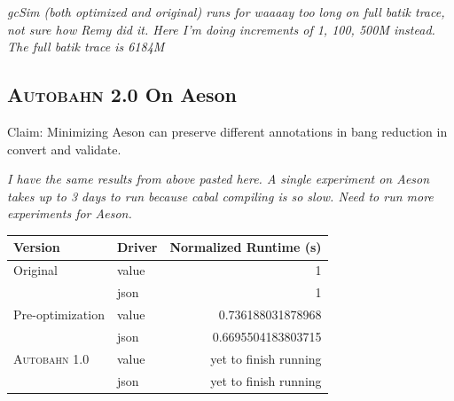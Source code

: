\documentclass[format=sigplan]{acmart}
\newcommand{\Ao}[0]{\textsc{Autobahn 1.0}}
\newcommand{\At}[0]{\textsc{Autobahn 2.0}}
\begin{document}
\textit{gcSim (both optimized and original) runs for waaaay too long on full batik trace, not sure how Remy did it. Here I'm doing increments of 1, 100, 500M instead. The full batik trace is 6184M}
 
\subsection{\At{} On Aeson}
 
Claim: Minimizing Aeson can preserve different annotations in bang reduction in convert and validate.

\textit{I have the same results from above pasted here. A single experiment on Aeson takes up to 3 days to run because cabal compiling is so slow. Need to run more experiments for Aeson.}

\begin{tabular}{llr}
\hline
Version   & Driver & Normalized Runtime (s) \\
\hline
Original      & value   & 1     \\
          & json        & 1      \\
Pre-optimization       & value     & 0.736188031878968     \\
          & json        & 0.6695504183803715	\\
\Ao{}       & value     & yet to finish running      \\
          & json        & yet to finish running	\\

\hline
\end{tabular}
\end{document}
